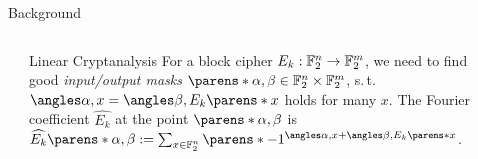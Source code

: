 \begin{columns}[t]
\begin{column}{\smallsepwid}\end{column}\begin{column}{\twocolwid}

\begin{alertblock}{Background}
	\begin{columns}[t]
	\begin{column}{0.001\paperwidth}\end{column}\begin{column}{\smallonecolwid}

	\begin{block}{Linear Cryptanalysis}
		For a block cipher $E_k : \mathbb{F}_2^n \to \mathbb{F}_2^m$, we need to find good \emph{input/output masks} $\parens*{\alpha, \beta} \in \F_2^n \times \F_2^m$, s.\,t. $\iprod{\alpha, x} = \iprod{\beta, E_k\parens*{x}}$ holds for many $x$.
		The Fourier coefficient $\widehat{E_k}$ at the point $\parens*{\alpha, \beta}$ is
		$\widehat{E_k}\parens*{\alpha, \beta} := \sum_{x \in \F_2^n} \parens*{-1}^{\iprod{\alpha, x} + \iprod{\beta, E_k\parens*{x}}}$.

	\end{block}


\end{column}
\end{columns}
\end{alertblock}
\end{column}
\end{columns}
